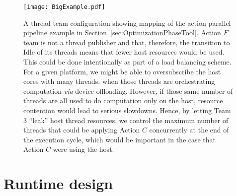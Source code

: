 \documentclass{article}
\begin{document}
\begin{figure}[!hp]
\begin{center}
\texttt{[image: BigExample.pdf]}
\caption[]{A thread team configuration showing mapping of the action parallel pipeline
example in Section~\ref{sec:OptimizationPhaseTool}.  Action $F$ team is not a
thread publisher and that, therefore, the
transition to Idle of its threads means that fewer host resources would be used.
This could be done intentionally as part of a load balancing scheme.  For
a given platform, we might be able to oversubscribe the host cores
with many threads, when those threads are orchestrating computation \textit{via}
device offloading.  However, if those same number of threads are all used to do
computation only on the host, resource contention would lead to serious
slowdowns.  Hence, by letting Team 3 ``leak'' host thread resources, we control
the maximum number of threads that could be applying Action $C$ concurrently at
the end of the execution cycle, which would be important in the case that Action
$C$ were using the host.}
\label{fig:BigConfigExample}
\end{center}
\end{figure}


\section{Runtime design}
\label{sec:Runtime}
\end{document}
